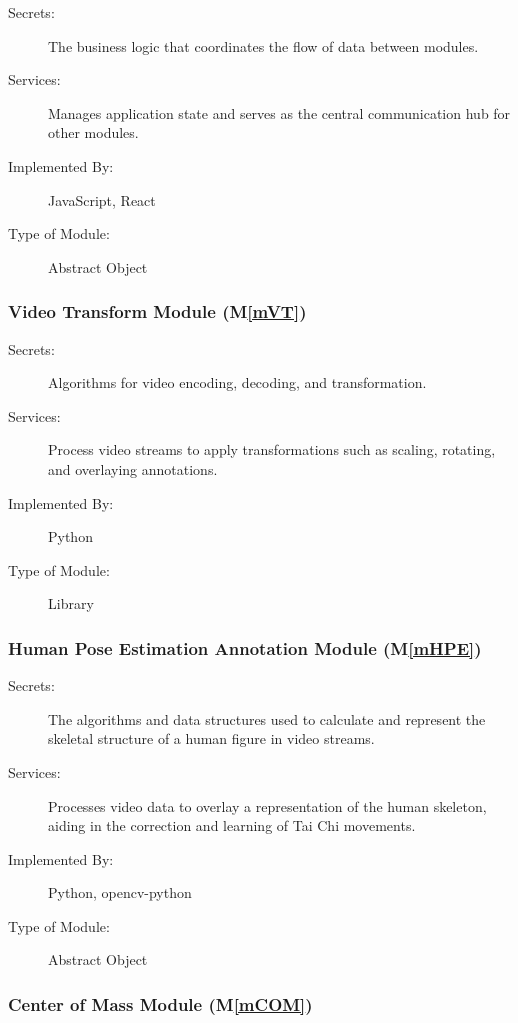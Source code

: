 \documentclass[12pt, titlepage]{article}
\newcommand{\mref}[1]{M\ref{#1}}
\begin{document}
\begin{description}
\item[Secrets:] The business logic that coordinates the flow of data between modules.
\item[Services:] Manages application state and serves as the central communication hub for other modules.
\item[Implemented By:] JavaScript, React
\item[Type of Module:] Abstract Object
\end{description}

\subsubsection{Video Transform Module (\mref{mVT})}

\begin{description}
\item[Secrets:] Algorithms for video encoding, decoding, and transformation.
\item[Services:] Process video streams to apply transformations such as scaling, rotating, and overlaying annotations.
\item[Implemented By:] Python
\item[Type of Module:] Library
\end{description}

\subsubsection{Human Pose Estimation Annotation Module (\mref{mHPE})}

\begin{description}
\item[Secrets:] The algorithms and data structures used to calculate and represent the skeletal structure of a human figure in video streams.
\item[Services:] Processes video data to overlay a representation of the human skeleton, aiding in the correction and learning of Tai Chi movements.
\item[Implemented By:] Python, opencv-python
\item[Type of Module:] Abstract Object
\end{description}

\subsubsection{Center of Mass Module (\mref{mCOM})}
\end{document}
